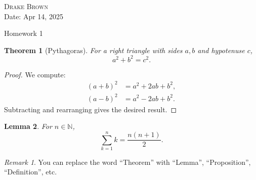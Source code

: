 \documentclass[12pt]{article}
\newcommand{\N}{\mathbb{N}}
\newtheorem{theorem}{Theorem}[section] %
\newtheorem{lemma}[theorem]{Lemma}     %
\theoremstyle{definition}
\theoremstyle{remark}
\newtheorem*{remark}{Remark}
\begin{document}
\begin{flushright}
	\textsc{Drake Brown}  \\
	Date: Apr 14, 2025
\end{flushright}
\begin{center}
	Homework 1
\end{center}


\begin{theorem}[Pythagoras]
	For a right triangle with sides $a,b$ and hypotenuse $c$,
	\begin{equation}
		a^2 + b^2 = c^2.
	\end{equation}
\end{theorem}

\begin{proof}
	We compute:
	\begin{align*}
		(a+b)^2 & = a^2 + 2ab + b^2, \\
		(a-b)^2 & = a^2 - 2ab + b^2.
	\end{align*}
	Subtracting and rearranging gives the desired result.
\end{proof}

\begin{lemma}
	For $n \in \N$,
	\[
		\sum_{k=1}^n k = \frac{n(n+1)}{2}.
	\]
\end{lemma}

\begin{remark}
	You can replace the word “Theorem” with “Lemma”, “Proposition”, “Definition”, etc.
\end{remark}

\end{document}
